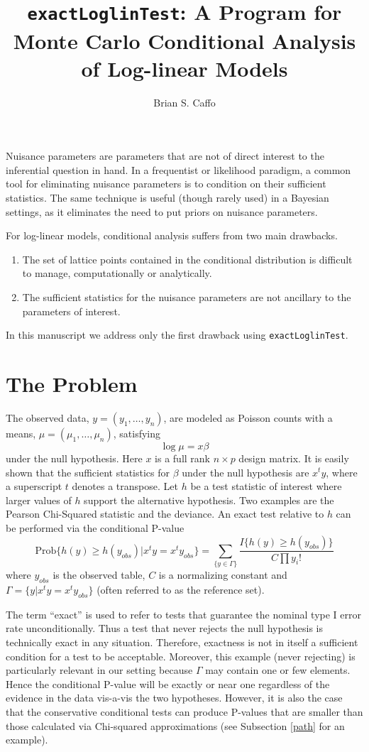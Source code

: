 \documentclass[a4paper]{article}
\title{\texttt{exactLoglinTest}: A Program for Monte Carlo Conditional
Analysis of Log-linear Models}
\author{Brian S. Caffo}
\begin{document}
 
\maketitle 

Nuisance parameters are parameters that are not of direct interest to
the inferential question in hand. In a frequentist or likelihood
paradigm, a common tool for eliminating nuisance parameters is to
condition on their sufficient statistics. The same technique is useful
(though rarely used) in a Bayesian settings, as it eliminates the need
to put priors on nuisance parameters.

For log-linear models, conditional analysis suffers from two main drawbacks.
\begin{enumerate}
\item The set of lattice points contained in the conditional distribution is difficult to manage, 
      computationally or analytically.
\item The sufficient statistics for the nuisance parameters are not ancillary to the 
      parameters of interest.
\end{enumerate}
In this manuscript we address only the first drawback using \texttt{exactLoglinTest}.

\section{The Problem} 

The observed data, $y = (y_1, \ldots, y_n)$, are modeled as Poisson
counts with a means, $\mu = (\mu_1,\ldots,\mu_n)$, satisfying $$ \log
\mu = x \beta $$ under the null hypothesis. Here $x$ is a full rank
$n\times p$ design matrix. It is easily shown that the sufficient
statistics for $\beta$ under the null hypothesis are $x^t y$, where a
superscript $t$ denotes a transpose. Let $h$ be a test statistic of
interest where larger values of $h$ support the alternative
hypothesis. Two examples are the Pearson Chi-Squared statistic and the
deviance. An exact test relative to $h$ can be performed via the
conditional P-value
$$
\mbox{Prob}\{h(y) \geq h(y_{obs}) | x^t y = x^t y_{obs}\} = \sum_{\{y
\in \Gamma\}} \frac{I\{h(y) \geq h(y_{obs})\}}{C \prod y_i!}  
$$ 
where $y_{obs}$ is the observed table, $C$ is a normalizing
constant and $\Gamma = \{y | x^t y = x^t y_{obs}\}$  (often referred
to as the reference set).

The term ``exact'' is used to refer to tests that guarantee the
nominal type I error rate unconditionally. Thus a test that never
rejects the null hypothesis is technically exact in any
situation. Therefore, exactness is not in itself a sufficient
condition for a test to be acceptable.  Moreover, this example (never
rejecting) is particularly relevant in our setting because $\Gamma$
may contain one or few elements. Hence the conditional P-value will be
exactly or near one regardless of the evidence in the data vis-a-vis
the two hypotheses.  However, it is also the case that the
conservative conditional tests can produce P-values that are smaller
than those calculated via Chi-squared approximations (see Subsection
\ref{path} for an example).
\end{document}
